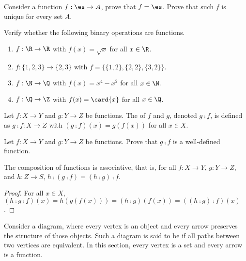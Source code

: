 \documentclass[10pt]{article}
\begin{document}
\begin{problem}
    Consider a function $f:\es\to A$, prove that $f=\es$. Prove that such $f$ is unique for every set $A$.
\end{problem}
\begin{problem}
    Verify whether the following binary operations are functions.
    \begin{enumerate}
        \item $f:\R\to\R$ with $f(x)=\sqrt{x}$ for all $x\in\R$.
        \item $f:\{1,2,3\}\to\{2,3\}$ with $f=\{\{1,2\},\{2,2\},\{3,2\}\}$.
        \item $f:\N\to\Q$ with $f(x)={x}^{4}-{x}^{2}$ for all $x\in\N$.
        \item $f:\Q\to\Z$ with $f(x)=\card{x}$ for all $x\in\Q$.
    \end{enumerate}
\end{problem}
\begin{definition}
    Let $f:X\to Y$ and $g:Y\to Z$ be functions. The  of $f$ and $g$, denoted $g\comp f$, is defined as $g\comp f:X\to Z$ with $(g\comp f)(x)=g(f(x))$ for all $x\in X$.
\end{definition}
\begin{problem}
    Let $f:X\to Y$ and $g:Y\to Z$ be functions. Prove that $g\comp f$ is a well-defined function.
\end{problem}
\begin{proposition}
    The composition of functions is associative, that is, for all $f:X\to Y$, $g:Y\to Z$, and $h:Z\to S$, $h\comp(g\comp f)=(h\comp g)\comp f$.
\end{proposition}
\begin{proof}
    For all $x\in X$, $(h\comp g\comp f)(x)=h(g(f(x)))=(h\comp g)(f(x))=((h\comp g)\comp f)(x)$.
\end{proof}
\par
Consider a diagram, where every vertex is an object and every arrow preserves the structure of those objects. Such a diagram is said to be  if all paths between two vertices are equivalent. In this section, every vertex is a set and every arrow is a function.
\end{document}
